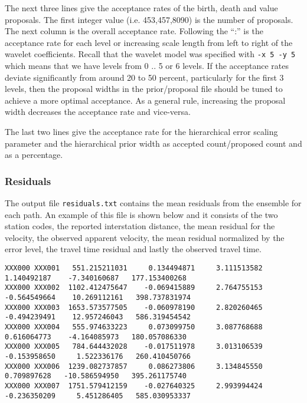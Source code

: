 \documentclass[a4paper,12pt]{article}
\begin{document}
The next three lines give the acceptance rates of the birth, death and
value proposals. The first integer value (i.e. 453,457,8090) is the
number of proposals.  The next column is the overall acceptance
rate. Following the ``:'' is the acceptance rate for each level or
increasing scale length from left to right of the wavelet
coefficients. Recall that the wavelet model was specified with {\tt -x
  5 -y 5} which means that we have levels from 0 .. 5 or 6 levels.
If the acceptance rates deviate significantly from around 20 to 50
percent, particularly for the first 3 levels, then the proposal
widths in the prior/proposal file should be tuned to achieve a
more optimal acceptance. As a general rule, increasing the
proposal width decreases the acceptance rate and vice-versa.

The last two lines give the acceptance rate for the hierarchical error
scaling parameter and the hierarchical prior width as accepted
count/proposed count and as a percentage.

\subsubsection{Residuals}

The output file {\tt residuals.txt} contains the mean residuals from the
ensemble for each path. An example of this file is shown below and
it consists of the two station codes, the reported interstation
distance, the mean residual for the velocity, the observed apparent velocity,
the mean residual normalized by the error level, the travel time residual
and lastly the observed travel time.

\begin{flushleft}
  \tiny
\begin{verbatim}
XXX000 XXX001   551.215211031     0.134494871     3.111513582     1.140492187    -7.340160687   177.153400268
XXX000 XXX002  1102.412475647    -0.069415889     2.764755153    -0.564549664    10.269112161   398.737831974
XXX000 XXX003  1653.573577505    -0.060978190     2.820260465    -0.494239491    12.957246043   586.319454542
XXX000 XXX004   555.974633223     0.073099750     3.087768688     0.616064773    -4.164085973   180.057086330
XXX000 XXX005   784.644432028    -0.017511978     3.013106539    -0.153958650     1.522336176   260.410450766
XXX000 XXX006  1239.082737857     0.086273806     3.134845550     0.709897628   -10.586594950   395.261175740
XXX000 XXX007  1751.579412159    -0.027640325     2.993994424    -0.236350209     5.451286405   585.030953337
\end{verbatim}
\end{flushleft}
\end{document}
